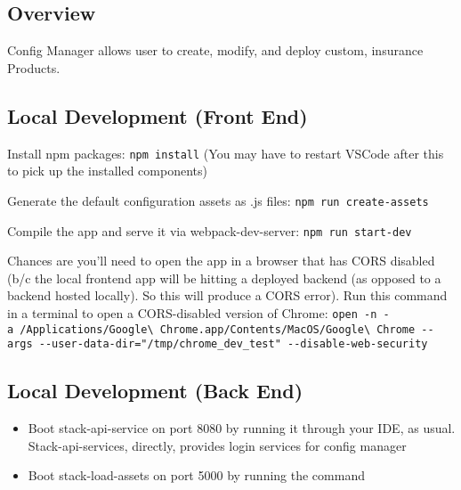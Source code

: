 \hypertarget{overview}{%
\subsection{Overview}\label{overview}}

Config Manager allows user to create, modify, and deploy custom,
insurance Products.

\hypertarget{local-development-front-end}{%
\subsection{Local Development (Front
End)}\label{local-development-front-end}}

Install npm packages: \texttt{npm\ install} (You may have to restart
VSCode after this to pick up the installed components)

Generate the default configuration assets as .js files:
\texttt{npm\ run\ create-assets}

Compile the app and serve it via webpack-dev-server:
\texttt{npm\ run\ start-dev}

Chances are you'll need to open the app in a browser that has CORS
disabled (b/c the local frontend app will be hitting a deployed backend
(as opposed to a backend hosted locally). So this will produce a CORS
error). Run this command in a terminal to open a CORS-disabled version
of Chrome:
\texttt{open\ -n\ -a\ /Applications/Google\textbackslash{}\ Chrome.app/Contents/MacOS/Google\textbackslash{}\ Chrome\ -\/-args\ -\/-user-data-dir="/tmp/chrome\_dev\_test"\ -\/-disable-web-security}

\hypertarget{local-development-back-end}{%
\subsection{Local Development (Back
End)}\label{local-development-back-end}}

\begin{itemize}
\tightlist
\item
  Boot stack-api-service on port 8080 by running it through your IDE, as
  usual. Stack-api-services, directly, provides login services for
  config manager
\item
  Boot stack-load-assets on port 5000 by running the command
\end{itemize}

\begin{Shaded}
\begin{Highlighting}[]
\end{Highlighting}
\end{Shaded}

